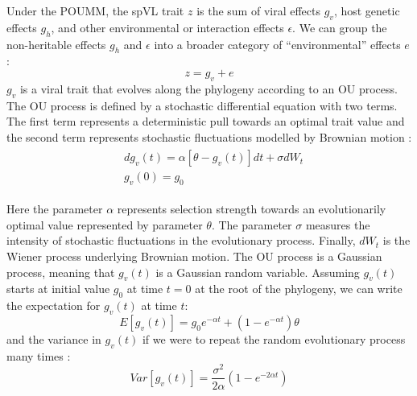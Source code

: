 \documentclass[]{article}
\begin{document}
\begin{doublespace}
Under the POUMM, the spVL trait $z$ is the sum of viral effects $g_v$, host genetic effects $g_h$, and other environmental or interaction effects $\epsilon$. We can group the non-heritable effects $g_h$ and $\epsilon$ into a broader category of ``environmental'' effects $e$: 
\begin{equation}
    z = g_{v} + e
\end{equation}
$g_v$ is a viral trait that evolves along the phylogeny according to an OU process. The OU process is defined by a stochastic differential equation with two terms. The first term represents a deterministic pull towards an optimal trait value and the second term represents stochastic fluctuations modelled by Brownian motion \citep{Butler2004}:
\begin{align}
\begin{split}
	&dg_v(t) = \alpha[\theta - g_v(t)]dt + \sigma dW_t \\
	&g_v(0) = g_0 
	\label{eq:OUprocess}
\end{split}
\end{align}

Here the parameter $\alpha$ represents selection strength towards an evolutionarily optimal value represented by parameter $\theta$. The parameter $\sigma$ measures the intensity of stochastic fluctuations in the evolutionary process. Finally, $dW_t$ is the Wiener process underlying Brownian motion. The OU process is a Gaussian process, meaning that $g_v(t)$ is a Gaussian random variable. Assuming $g_v(t)$ starts at initial value $g_0$ at time $t = 0$ at the root of the phylogeny, we can write the expectation for $g_v(t)$ at time $t$: 
\begin{equation}
   E[g_v(t)] = g_0e^{-\alpha t} + (1 - e^{-\alpha t})\theta \label{eq:OUmean}
\end{equation}
and the variance in $g_v(t)$ if we were to repeat the random evolutionary process many times \citep{Butler2004}:
\begin{equation}
    Var[g_v(t)] = \frac{\sigma^2}{2\alpha}(1 - e^{-2\alpha t}) \label{eq:OUVar}
\end{equation}


\end{doublespace}
\end{document}
